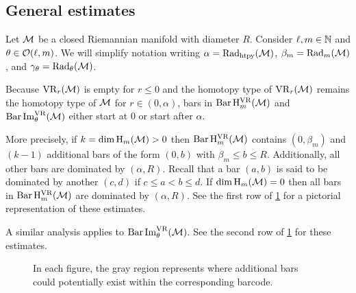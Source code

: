 \subsection{General estimates}\label{ss:barcode_general}

Let \(\mathcal{M}\) be a closed Riemannian manifold with diameter \(R\).
Consider \(\ell, m \in \mathbb{N}\) and \(\theta \in \mathcal{O}(\ell,m)\).
We will simplify notation writing \(\alpha = \mathrm{Rad}_{\mathrm{htpy}}(\mathcal{M})\), \(\beta_m = \mathrm{Rad}_{m}(\mathcal{M})\), and \(\gamma_\theta = \mathrm{Rad}_{\theta}(\mathcal{M})\).

Because $\mathrm{VR}_r(\mathcal{M})$ is empty for \(r \leq 0\) and the homotopy type of $\mathrm{VR}_r(\mathcal{M})$ remains the homotopy type of $\mathcal{M}$ for $r \in (0, \alpha)$, bars in \(\operatorname{Bar} \mathrm{H}_m^{\mathrm{VR}}(\mathcal{M})\) and $\operatorname{Bar}\operatorname{Im}_\theta^{\mathrm{VR}}(\mathcal{M})$ either start at $0$ or start after $\alpha$.

More precisely,
if \(k = \dim \operatorname{H}_m(\mathcal{M}) > 0\) then $\operatorname{Bar}\mathrm{H}_m^{\mathrm{VR}}(\mathcal{M})$ contains $(0, \beta_m)$ and \((k - 1)\) additional bars of the form \((0, b)\) with \(\beta_m \leq b \leq R\).
Additionally, all other bars are dominated by \((\alpha, R)\).
Recall that a bar $(a, b)$ is said to be dominated by another $(c,d)$ if $c \leq a < b \leq d$.
If \(\dim \operatorname{H}_m(\mathcal{M}) = 0\) then all bars in \(\operatorname{Bar}\mathrm{H}_m^{\mathrm{VR}}(\mathcal{M})\) are dominated by \((\alpha, R)\).
See the first row of \cref{fig:barcodes_general} for a pictorial representation of these estimates.

A similar analysis applies to $\operatorname{Bar}\operatorname{Im}_\theta^{\mathrm{VR}}(\mathcal{M})$.
See the second row of \cref{fig:barcodes_general} for these estimates.

\begin{figure}
	\centering
	
	\caption{In each figure, the gray region represents where additional bars could potentially exist within the corresponding barcode.}
	\label{fig:barcodes_general}
\end{figure}